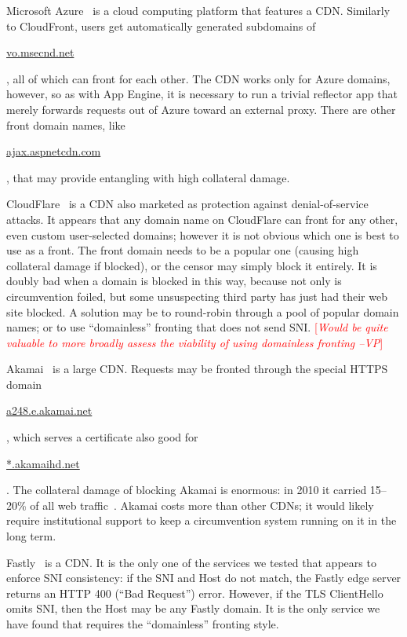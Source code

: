 \documentclass{sig-alternate}
\newcommand{\meek}{meek\xspace}
\def\urll#1{\begin{NoHyper}\url{#1}\end{NoHyper}}
\newcommand{\note}[1]{{\textcolor{red}{[\textit{#1}]}}}
\newcommand{\vp}[1]{\note{#1 --VP}}
\begin{document}
Microsoft Azure~\cite{azure}
is a cloud computing platform that features a CDN.
Similarly to CloudFront, users get automatically generated subdomains
of \urll{vo.msecnd.net},
all of which can front for each other.
The CDN works only for Azure domains, however,
so as with App Engine, it is necessary to run a trivial reflector app
that merely forwards requests out of Azure toward an external proxy.
There are other front domain names, like \urll{ajax.aspnetcdn.com},
that may provide entangling with high collateral damage.

CloudFlare~\cite{cloudflare}
is a CDN also marketed as protection against
denial-of-service attacks.
It appears that any domain name on CloudFlare
can front for any other, even custom user-selected domains;
however it is not obvious which one is best to use as a front.
The front domain needs to be a popular one
(causing high collateral damage if blocked),
or the censor may simply block it entirely.
It is doubly bad when a domain is blocked in this way,
because not only is circumvention foiled,
but some unsuspecting third party has just had their web site blocked.
A solution may be to round-robin through
a pool of popular domain names;
or to use ``domainless'' fronting that does not send SNI.
\vp{Would be quite valuable to more broadly assess the viability
of using domainless fronting}

Akamai~\cite{akamai-site} is a large CDN.
Requests may be fronted through the special HTTPS domain
\urll{a248.e.akamai.net},
which serves a certificate also good for \urll{*.akamaihd.net}.
The collateral damage of blocking Akamai is enormous:
in 2010 it carried 15--20\% of all web traffic~\cite{akamai}.
Akamai costs more than other CDNs;
it would likely require institutional support
to keep a circumvention system running on it in the long term.

Fastly~\cite{fastly} is a CDN.
It is the only one of the services we tested that
appears to enforce SNI consistency:
if the SNI and Host do not match,
the Fastly edge server returns an HTTP 400 (``Bad Request'') error.
However, if the TLS ClientHello omits SNI, then the Host may be any Fastly domain.
It is the only service we have found
that requires the ``domainless'' fronting style.
\end{document}
